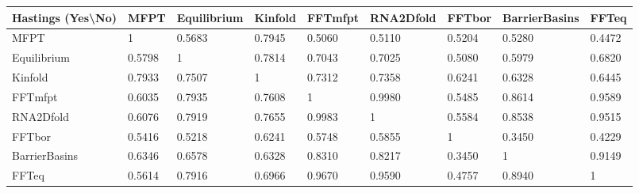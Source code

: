 \begin{table*}
\begin{tabular}
  {|l|llllllll|} \hline \small{Hastings (Yes\textbackslash No)} & \small{MFPT} & \small{Equilibrium} & \small{Kinfold} & \small{FFTmfpt} & \small{RNA2Dfold} & \small{FFTbor} & \small{BarrierBasins} & \small{FFTeq} \\
  \hline \small{MFPT}   & 1      & 0.5683 & 0.7945 & 0.5060 & 0.5110 & 0.5204 & 0.5280 & 0.4472 \\
  \small{Equilibrium}   & 0.5798 & 1      & 0.7814 & 0.7043 & 0.7025 & 0.5080 & 0.5979 & 0.6820 \\
  \small{Kinfold}       & 0.7933 & 0.7507 & 1      & 0.7312 & 0.7358 & 0.6241 & 0.6328 & 0.6445 \\
  \small{FFTmfpt}       & 0.6035 & 0.7935 & 0.7608 & 1      & 0.9980 & 0.5485 & 0.8614 & 0.9589 \\
  \small{RNA2Dfold}     & 0.6076 & 0.7919 & 0.7655 & 0.9983 & 1      & 0.5584 & 0.8538 & 0.9515 \\
  \small{FFTbor}        & 0.5416 & 0.5218 & 0.6241 & 0.5748 & 0.5855 & 1      & 0.3450 & 0.4229 \\
  \small{BarrierBasins} & 0.6346 & 0.6578 & 0.6328 & 0.8310 & 0.8217 & 0.3450 & 1      & 0.9149 \\
  \small{FFTeq}         & 0.5614 & 0.7916 & 0.6966 & 0.9670 & 0.9590 & 0.4757 & 0.8940 & 1      \\
  \hline
 \end{tabular}


\end{table*}
